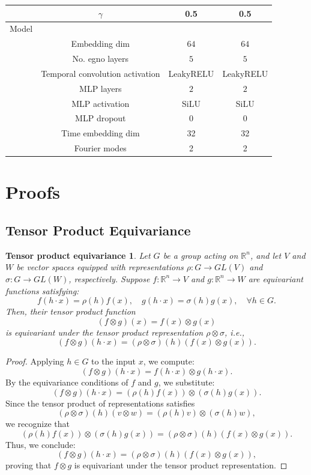\begin{table}[H]
\begin{tabular}{cccc}
        & \(\gamma\) & 0.5 & 0.5 \\
        \midrule
        Model & & \\
        & Embedding dim & \( 64 \) & \( 64 \) \\
        & No. \gls{egno} layers & \( 5 \) & \( 5 \) \\
        & Temporal convolution activation & LeakyRELU & LeakyRELU \\
        & MLP layers & \( 2 \) & \( 2 \) \\
        & MLP activation & SiLU & SiLU \\
        & MLP dropout & \( 0 \) & \( 0 \) \\
        & Time embedding dim & 32 & 32 \\
        & Fourier modes & 2 & 2 \\
        \bottomrule
    \end{tabular}
\end{table}

\section{Proofs}
\subsection{Tensor Product Equivariance}
\label{appx:tpeq}
\newtheorem{tpeq}{Tensor product equivariance}
\begin{tpeq} \label{thm:tpeq}
    Let \( G \) be a group acting on \( \mathbb{R}^n \), and let \( V \) and \( W \) be vector spaces equipped with representations \( \rho: G \to GL(V) \) and \( \sigma: G \to GL(W) \), respectively. Suppose \( f: \mathbb{R}^n \to V \) and \( g: \mathbb{R}^n \to W \) are equivariant functions satisfying:
    \[
    f(h \cdot x) = \rho(h) f(x), \quad g(h \cdot x) = \sigma(h) g(x), \quad \forall h \in G.
    \]
    Then, their tensor product function
    \[
    (f \otimes g)(x) = f(x) \otimes g(x)
    \]
    is equivariant under the tensor product representation \( \rho \otimes \sigma \), i.e.,
    \[
    (f \otimes g)(h \cdot x) = (\rho \otimes \sigma)(h) (f(x) \otimes g(x)).
    \]
\end{tpeq}

\begin{proof}
    Applying \( h \in G \) to the input \( x \), we compute:
    \[
    (f \otimes g)(h \cdot x) = f(h \cdot x) \otimes g(h \cdot x).
    \]
    By the equivariance conditions of \( f \) and \( g \), we substitute:
    \[
    (f \otimes g)(h \cdot x) = (\rho(h) f(x)) \otimes (\sigma(h) g(x)).
    \]
    Since the tensor product of representations satisfies
    \[
    (\rho \otimes \sigma)(h) (v \otimes w) = (\rho(h) v) \otimes (\sigma(h) w),
    \]
    we recognize that
    \[
    (\rho(h) f(x)) \otimes (\sigma(h) g(x)) = (\rho \otimes \sigma)(h) (f(x) \otimes g(x)).
    \]
    Thus, we conclude:
    \[
    (f \otimes g)(h \cdot x) = (\rho \otimes \sigma)(h) (f(x) \otimes g(x)),
    \]
    proving that \( f \otimes g \) is equivariant under the tensor product representation.
\end{proof}


